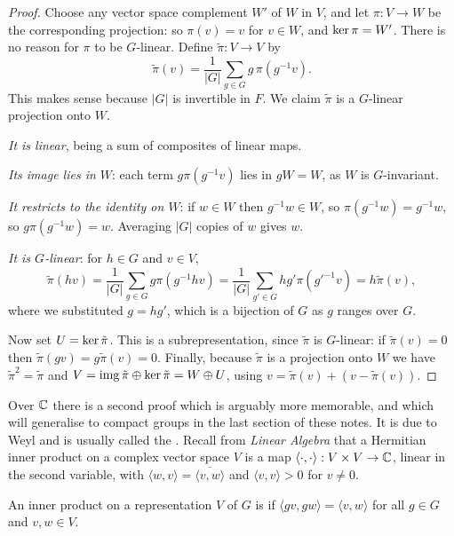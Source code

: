 \documentclass[a4paper]{scrartcl}
\newcommand{\ip}[2]{\langle #1, #2 \rangle}
\begin{document}
\begin{proof}
	Choose any vector space complement $W'$ of $W$ in $V$, and let $\pi : V \to W$ be the corresponding projection: so $\pi(v) = v$ for $v \in W$, and $\operatorname{ker} \pi = W'$. There is no reason for $\pi$ to be $G$-linear. Define $\tilde\pi : V \to V$ by
	$$\tilde{\pi}(v) = \frac{1}{|G|}\sum_{g \in G} g\, \pi(g^{-1} v).$$
	This makes sense because $|G|$ is invertible in $F$. We claim $\tilde\pi$ is a $G$-linear projection onto $W$.

	\emph{It is linear}, being a sum of composites of linear maps.

	\emph{Its image lies in $W$}: each term $g \pi(g^{-1}v)$ lies in $gW = W$, as $W$ is $G$-invariant.

	\emph{It restricts to the identity on $W$}: if $w \in W$ then $g^{-1}w \in W$, so $\pi(g^{-1}w) = g^{-1}w$, so $g\pi(g^{-1}w) = w$. Averaging $|G|$ copies of $w$ gives $w$.

	\emph{It is $G$-linear}: for $h \in G$ and $v \in V$,
	$$\tilde\pi(hv) = \frac{1}{|G|}\sum_{g \in G} g \pi(g^{-1}hv) = \frac{1}{|G|}\sum_{g' \in G} h g' \pi(g'^{-1}v) = h \tilde\pi(v),$$
	where we substituted $g = hg'$, which is a bijection of $G$ as $g$ ranges over $G$.

	Now set $U = \operatorname{ker} \tilde{\pi}$. This is a subrepresentation, since $\tilde\pi$ is $G$-linear: if $\tilde\pi(v) = 0$ then $\tilde\pi(gv) = g\tilde\pi(v) = 0$. Finally, because $\tilde\pi$ is a projection onto $W$ we have $\tilde\pi^2 = \tilde\pi$ and $V = \operatorname{img} \tilde\pi \oplus \operatorname{ker} \tilde\pi = W \oplus U$, using $v = \tilde\pi(v) + (v - \tilde\pi(v))$.
\end{proof}

Over $\mathbb{C}$ there is a second proof which is arguably more memorable, and which will generalise to compact groups in the last section of these notes. It is due to Weyl and is usually called the . Recall from \emph{Linear Algebra} that a Hermitian inner product on a complex vector space $V$ is a map $\ip{\cdot}{\cdot} : V\times V \to \C$, linear in the second variable, with $\ip{w}{v} = \overline{\ip{v}{w}}$ and $\ip{v}{v} > 0$ for $v \neq 0$.

\begin{definition}
	An inner product on a representation $V$ of $G$ is  if $\ip{gv}{gw} = \ip{v}{w}$ for all $g \in G$ and $v, w \in V$.
\end{definition}
\end{document}
